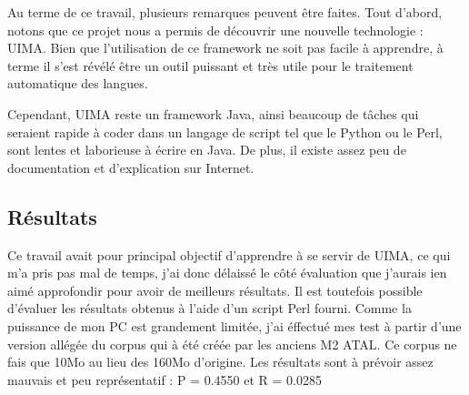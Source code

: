 \documentclass[a4paper]{article}
\begin{document}
	Au terme de ce travail, plusieurs remarques peuvent être faites. Tout d'abord, notons que ce projet nous a permis de découvrir une nouvelle technologie : UIMA. Bien que l'utilisation de ce framework ne soit pas facile à apprendre, à terme il s'est révélé être un outil puissant et très utile pour le traitement automatique des langues. 

	Cependant, UIMA reste un framework Java, ainsi beaucoup de tâches qui seraient rapide à coder dans un langage de script tel que le Python ou le Perl, sont lentes et laborieuse à écrire en Java. De plus, il existe assez peu de documentation et d'explication sur Internet.

	\subsection*{Résultats}
	Ce travail avait pour principal objectif d'apprendre à se servir de UIMA, ce qui m'a pris pas mal de temps, j'ai donc délaissé le côté évaluation que j'aurais ien aimé approfondir pour avoir de meilleurs résultats. Il est toutefois possible d’évaluer les résultats obtenus à l’aide d’un script Perl fourni. Comme la puissance de mon PC est grandement limitée, j'ai éffectué mes test à partir d'une version allégée du corpus qui à été créée par les anciens M2 ATAL. Ce corpus ne fais que 10Mo au lieu des 160Mo d'origine. Les résultats sont à prévoir assez mauvais et peu représentatif : P = 0.4550 et R = 0.0285

	
\end{document}
